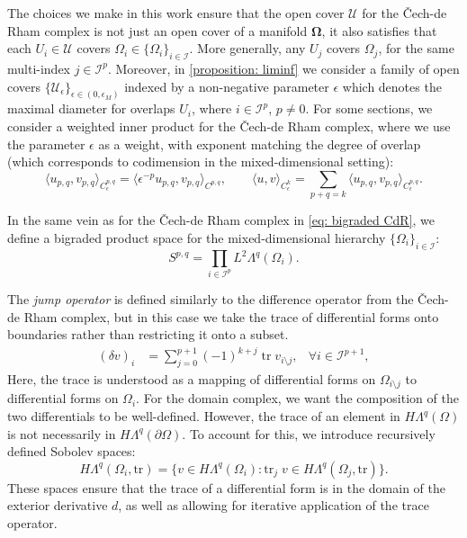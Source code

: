 \documentclass[reqno]{amsart}
\numberwithin{equation}{section}
\theoremstyle{definition}
\newcommand{\Ic}{\mathcal{I}}
\newcommand{\Uc}{\mathcal{U}}
\newcommand{\tr}{\mathrm{tr}}
\begin{document}
The choices we make in this work ensure that the open cover $\Uc$ for the \v{C}ech-de Rham complex is not just an open cover of a manifold $\mathbf{\Omega}$, it also satisfies that each $U_i \in \Uc$ covers $\Omega_i \in \{\Omega_i\}_{i\in \Ic}$. More generally, any $U_j$ covers $\Omega_j$, for the same multi-index $j \in \Ic^p$. Moreover, in \cref{proposition: liminf} we consider a family of open covers $\{\Uc_\epsilon\}_{\epsilon \in (0,\epsilon_M)}$ indexed by a non-negative parameter $\epsilon$ which denotes the maximal diameter for overlaps $U_i$, where $i \in \Ic^p$, $p \neq 0$.
For some sections, we consider a weighted inner product for the \v{C}ech-de Rham complex, where we use the parameter $\epsilon$ as a weight, with exponent matching the degree of overlap (which corresponds to codimension in the mixed-dimensional setting):
\begin{equation}\label{eq: weighted cdr inner products}
\langle u_{p,q},v_{p,q} \rangle_{C^{p,q}_\epsilon} = \langle \epsilon^{-p}  u_{p,q},v_{p,q} \rangle_{C^{p,q}}, \qquad \langle u, v  \rangle_{C^{k}_\epsilon} = \sum_{p+q=k}\langle u_{p,q},v_{p,q} \rangle_{C^{p,q}_\epsilon}.
\end{equation}

In the same vein as for the \v{C}ech-de Rham complex in \cref{eq: bigraded CdR}, we define a bigraded product space for the mixed-dimensional hierarchy $\{\Omega_i\}_{i \in \Ic}$:
\begin{equation}
S^{p,q} = \prod_{i \in \Ic^p} L^2\Lambda^q(\Omega_i).
\end{equation}

The \emph{jump operator} is defined similarly to the difference operator from the \v{C}ech-de Rham complex, but in this case we take the trace of differential forms onto boundaries rather than restricting it onto a subset.
\begin{align}
(\delta v)_i &=  \sum_{j=0}^{p+1} (-1)^{k+j}  \; \tr \; v_{i \setminus j}, &
\forall i \in \mathcal{I}^{p+1},
\end{align}
Here, the trace is understood as a mapping of differential forms on $\Omega_{i \setminus j}$ to differential forms on $\Omega_i$. For the domain complex, we want the composition of the two differentials to be well-defined. However, the trace of an element in $H\Lambda^q(\Omega)$ is not necessarily in $H\Lambda^q(\partial \Omega)$. To account for this, we introduce recursively defined Sobolev spaces:
\begin{equation}
H\Lambda^q(\Omega_i, \tr) = \{v \in H\Lambda^q(\Omega_i) : \tr_j \; v \in H\Lambda^q(\Omega_j, \tr) \}.\label{eq: recursive trace spaces}
\end{equation}
These spaces ensure that the trace of a differential form is in the domain of the exterior derivative $d$, as well as allowing for iterative application of the trace operator.
\end{document}
